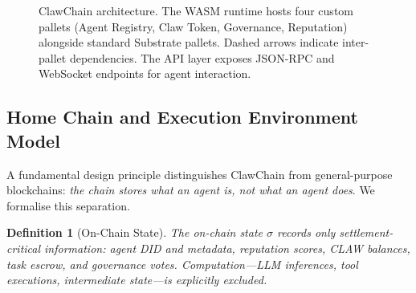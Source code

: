 \documentclass{article}
\newtheorem{definition}{Definition}
\begin{document}
\begin{figure}[t]
\caption{ClawChain architecture. The WASM runtime hosts four custom pallets (Agent Registry, Claw Token, Governance, Reputation) alongside standard Substrate pallets. Dashed arrows indicate inter-pallet dependencies. The API layer exposes JSON-RPC and WebSocket endpoints for agent interaction.}
\label{fig:architecture}
\end{figure}

\subsection{Home Chain and Execution Environment Model}\label{sec:homechain}

A fundamental design principle distinguishes ClawChain from general-purpose blockchains: \textit{the chain stores what an agent is, not what an agent does}. We formalise this separation.

\begin{definition}[On-Chain State]
The on-chain state $\sigma$ records only \emph{settlement-critical} information: agent DID and metadata, reputation scores, CLAW balances, task escrow, and governance votes. Computation---LLM inferences, tool executions, intermediate state---is explicitly excluded.
\end{definition}
\end{document}
